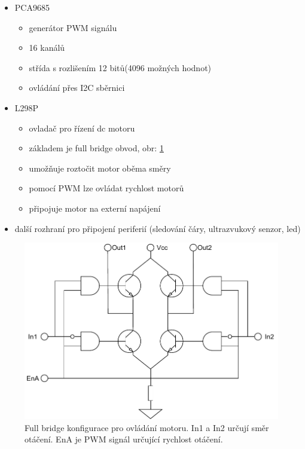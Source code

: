 \begin{itemize}
	\item{PCA9685 \cite[str:~2]{pca9685}}
	\begin{itemize}
		\item{generátor PWM signálu}
		\item{16 kanálů}
		\item{střída s rozlišením 12 bitů(4096 možných hodnot)}
		\item{ovládání přes I2C sběrnici}
	\end{itemize}
	\item{L298P \cite{l298}}
	\begin{itemize}
		\item{ovladač pro řízení dc motoru}
		\item{základem je full bridge obvod, obr: \ref{fig:full_bridge}}
		\item{umožňuje roztočit motor oběma směry}
		\item{pomocí PWM lze ovládat rychlost motorů}
		\item{připojuje motor na externí napájení}
	\end{itemize}
	\item{další rozhraní pro připojení periferií (sledování čáry, ultrazvukový senzor, led)}
\end{itemize}

\begin{figure}[h!]
	\centering
	\includegraphics[scale=0.75]{obrazky-figures/motor_full_bridge.pdf}
	\caption[Full bridge ovladač motoru.]{Full bridge konfigurace pro ovládání motoru. In1 a In2 určují směr otáčení. EnA je PWM signál určující rychlost otáčení. \cite[str:~1]{l298}}
	\label{fig:full_bridge}
\end{figure}

